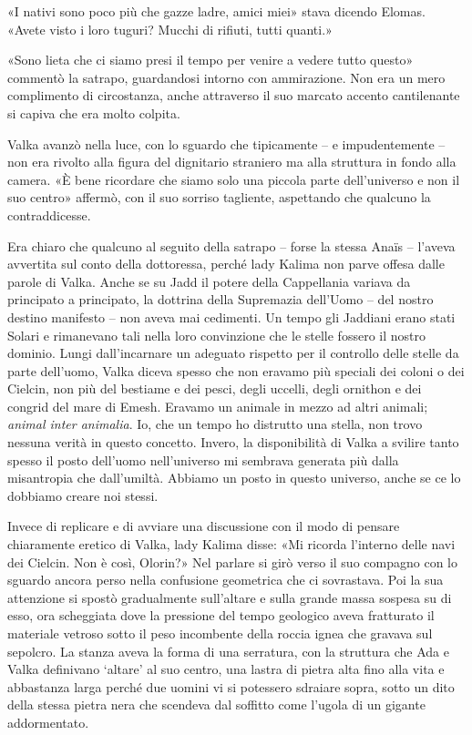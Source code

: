«I nativi sono poco più che gazze ladre, amici miei» stava dicendo
Elomas. «Avete visto i loro tuguri? Mucchi di rifiuti, tutti quanti.»

«Sono lieta che ci siamo presi il tempo per venire a vedere tutto
questo» commentò la satrapo, guardandosi intorno con ammirazione. Non
era un mero complimento di circostanza, anche attraverso il suo marcato
accento cantilenante si capiva che era molto colpita.

Valka avanzò nella luce, con lo sguardo che tipicamente -- e
impudentemente -- non era rivolto alla figura del dignitario straniero
ma alla struttura in fondo alla camera. «È bene ricordare che siamo solo
una piccola parte dell'universo e non il suo centro» affermò, con il suo
sorriso tagliente, aspettando che qualcuno la contraddicesse.

Era chiaro che qualcuno al seguito della satrapo -- forse la stessa
Anaïs -- l'aveva avvertita sul conto della dottoressa, perché lady
Kalima non parve offesa dalle parole di Valka. Anche se su Jadd il
potere della Cappellania variava da principato a principato, la dottrina
della Supremazia dell'Uomo -- del nostro destino manifesto -- non aveva
mai cedimenti. Un tempo gli Jaddiani erano stati Solari e rimanevano
tali nella loro convinzione che le stelle fossero il nostro dominio.
Lungi dall'incarnare un adeguato rispetto per il controllo delle stelle
da parte dell'uomo, Valka diceva spesso che non eravamo più speciali dei
coloni o dei Cielcin, non più del bestiame e dei pesci, degli uccelli,
degli ornithon e dei congrid del mare di Emesh. Eravamo un animale in
mezzo ad altri animali; \emph{animal inter animalia}. Io, che un tempo
ho distrutto una stella, non trovo nessuna verità in questo concetto.
Invero, la disponibilità di Valka a svilire tanto spesso il posto
dell'uomo nell'universo mi sembrava generata più dalla misantropia che
dall'umiltà. Abbiamo un posto in questo universo, anche se ce lo
dobbiamo creare noi stessi.

Invece di replicare e di avviare una discussione con il modo di pensare
chiaramente eretico di Valka, lady Kalima disse: «Mi ricorda l'interno
delle navi dei Cielcin. Non è così, Olorin?» Nel parlare si girò verso
il suo compagno con lo sguardo ancora perso nella confusione geometrica
che ci sovrastava. Poi la sua attenzione si spostò gradualmente
sull'altare e sulla grande massa sospesa su di esso, ora scheggiata dove
la pressione del tempo geologico {aveva} fratturato il materiale vetroso
sotto il peso incombente della roccia ignea che gravava sul sepolcro. La
stanza aveva la forma di una serratura, con la struttura che Ada e Valka
definivano `altare' al suo centro, una lastra di pietra alta fino alla
vita e abbastanza larga perché due uomini vi si potessero sdraiare
sopra, sotto un dito della stessa pietra nera che scendeva dal soffitto
come l'ugola di un gigante addormentato.

